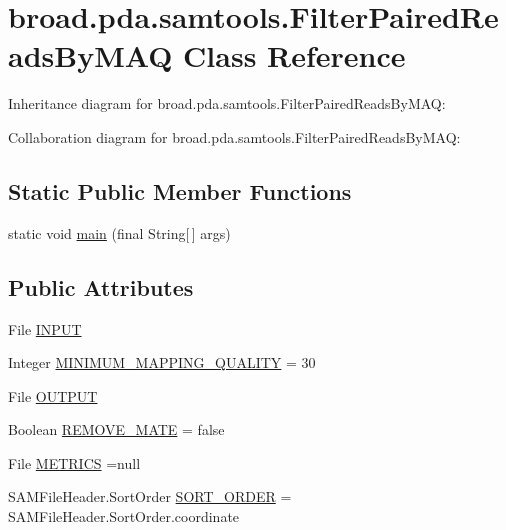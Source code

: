 \hypertarget{classbroad_1_1pda_1_1samtools_1_1_filter_paired_reads_by_m_a_q}{\section{broad.\+pda.\+samtools.\+Filter\+Paired\+Reads\+By\+M\+A\+Q Class Reference}
\label{classbroad_1_1pda_1_1samtools_1_1_filter_paired_reads_by_m_a_q}
}


Inheritance diagram for broad.\+pda.\+samtools.\+Filter\+Paired\+Reads\+By\+M\+A\+Q\+:


Collaboration diagram for broad.\+pda.\+samtools.\+Filter\+Paired\+Reads\+By\+M\+A\+Q\+:
\subsection*{Static Public Member Functions}
\begin{DoxyCompactItemize}
\item 
static void \hyperlink{classbroad_1_1pda_1_1samtools_1_1_filter_paired_reads_by_m_a_q_aece7432eeead701f3d75880e45aa7933}{main} (final String\mbox{[}$\,$\mbox{]} args)
\end{DoxyCompactItemize}
\subsection*{Public Attributes}
\begin{DoxyCompactItemize}
\item 
File \hyperlink{classbroad_1_1pda_1_1samtools_1_1_filter_paired_reads_by_m_a_q_a7c04255e908577a13183131023cb85f9}{I\+N\+P\+U\+T}
\item 
Integer \hyperlink{classbroad_1_1pda_1_1samtools_1_1_filter_paired_reads_by_m_a_q_a81bccf921d2530297b049b1543ea528c}{M\+I\+N\+I\+M\+U\+M\+\_\+\+M\+A\+P\+P\+I\+N\+G\+\_\+\+Q\+U\+A\+L\+I\+T\+Y} = 30
\item 
File \hyperlink{classbroad_1_1pda_1_1samtools_1_1_filter_paired_reads_by_m_a_q_a375591d5d4b86341a090330125e56d8d}{O\+U\+T\+P\+U\+T}
\item 
Boolean \hyperlink{classbroad_1_1pda_1_1samtools_1_1_filter_paired_reads_by_m_a_q_a2dd4db8bc62e0667cdb2bf2018f34f22}{R\+E\+M\+O\+V\+E\+\_\+\+M\+A\+T\+E} = false
\item 
File \hyperlink{classbroad_1_1pda_1_1samtools_1_1_filter_paired_reads_by_m_a_q_a7c8613003cc32f9496209a8c5768c084}{M\+E\+T\+R\+I\+C\+S} =null
\item 
S\+A\+M\+File\+Header.\+Sort\+Order \hyperlink{classbroad_1_1pda_1_1samtools_1_1_filter_paired_reads_by_m_a_q_a9a1d0819235dc343e31ec22d14c3bbac}{S\+O\+R\+T\+\_\+\+O\+R\+D\+E\+R} = S\+A\+M\+File\+Header.\+Sort\+Order.\+coordinate
\end{DoxyCompactItemize}
